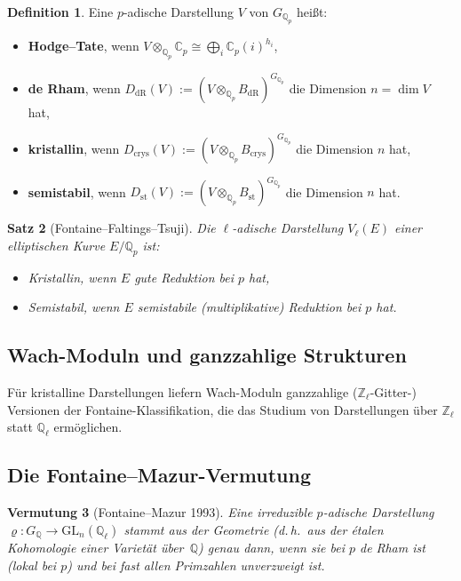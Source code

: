 \documentclass[a4paper,12pt]{amsart}
\newtheorem{theorem}{Satz}[section]
\newtheorem{conjecture}[theorem]{Vermutung}
\theoremstyle{definition}
\newtheorem{definition}[theorem]{Definition}
\theoremstyle{remark}
\newcommand{\Q}{\mathbb{Q}}
\newcommand{\Zl}{\mathbb{Z}_\ell}
\newcommand{\Ql}{\mathbb{Q}_\ell}
\newcommand{\GL}{\mathrm{GL}}
\newcommand{\BdR}{B_{\mathrm{dR}}}
\newcommand{\Bcrys}{B_{\mathrm{crys}}}
\begin{document}
\begin{definition}
Eine $p$-adische Darstellung $V$ von $G_{\Q_p}$ heißt:
\begin{itemize}
  \item \textbf{Hodge--Tate}, wenn $V \otimes_{\Q_p} \mathbb{C}_p \cong \bigoplus_i \mathbb{C}_p(i)^{h_i}$,
  \item \textbf{de Rham}, wenn $D_{\mathrm{dR}}(V) := (V \otimes_{\Q_p} \BdR)^{G_{\Q_p}}$ die Dimension $n = \dim V$ hat,
  \item \textbf{kristallin}, wenn $D_{\mathrm{crys}}(V) := (V \otimes_{\Q_p} \Bcrys)^{G_{\Q_p}}$ die Dimension $n$ hat,
  \item \textbf{semistabil}, wenn $D_{\mathrm{st}}(V) := (V \otimes_{\Q_p} B_{\mathrm{st}})^{G_{\Q_p}}$ die Dimension $n$ hat.
\end{itemize}
\end{definition}

\begin{theorem}[Fontaine--Faltings--Tsuji]
\label{satz:fontaine-vergleich}
Die $\ell$-adische Darstellung $V_\ell(E)$ einer elliptischen Kurve $E/\Q_p$ ist:
\begin{itemize}
  \item Kristallin, wenn $E$ gute Reduktion bei $p$ hat,
  \item Semistabil, wenn $E$ semistabile (multiplikative) Reduktion bei $p$ hat.
\end{itemize}
\end{theorem}

\subsection{Wach-Moduln und ganzzahlige Strukturen}

Für kristalline Darstellungen liefern Wach-Moduln ganzzahlige ($\Zl$-Gitter-)
Versionen der Fontaine-Klassifikation, die das Studium von Darstellungen über $\Zl$
statt $\Ql$ ermöglichen.

\subsection{Die Fontaine--Mazur-Vermutung}

\begin{conjecture}[Fontaine--Mazur 1993]
Eine irreduzible $p$-adische Darstellung $\varrho\colon G_\Q \to \GL_n(\Ql)$
stammt aus der Geometrie (d.\,h.\ aus der étalen Kohomologie einer Varietät über~$\Q$)
genau dann, wenn sie bei $p$ \emph{de Rham} ist (lokal bei $p$) und bei fast allen
Primzahlen unverzweigt ist.
\end{conjecture}
\end{document}
